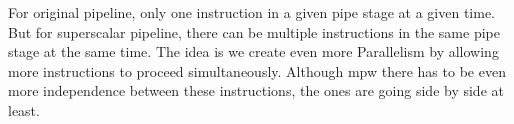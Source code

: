 For original pipeline, only one instruction in a given pipe stage at a given time.
But for superscalar pipeline, there can be multiple instructions in the same pipe
stage at the same time. The idea is we create even more Parallelism by allowing more 
instructions to proceed simultaneously. Although mpw there has to be even more independence
between these instructions, the ones are going side by side at least. 


